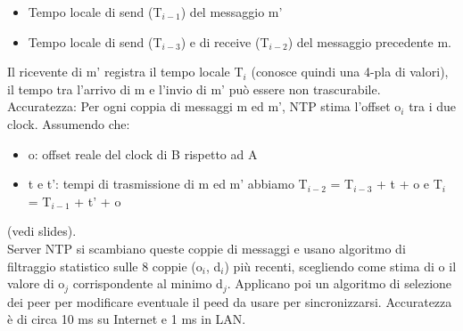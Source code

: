 \documentclass[16px]{article}
\begin{document}
\begin{itemize}
\item Tempo locale di send (T$_{i-1}$) del messaggio m'
\item Tempo locale di send (T$_{i-3}$) e di receive (T$_{i-2}$) del messaggio precedente m.
\end{itemize}
Il ricevente di m' registra il tempo locale T$_i$ (conosce quindi una 4-pla di valori), il tempo tra l'arrivo di m e l'invio di m' può essere non trascurabile.\\ Accuratezza: Per ogni coppia di messaggi m ed m', NTP stima l'offset o$_i$ tra i due clock. Assumendo che:
\begin{itemize}
\item o: offset reale del clock di B rispetto ad A
\item t e t': tempi di trasmissione di m ed m' abbiamo
T$_{i-2}$ =  T$_{i-3}$ + t + o e T$_i$ = T$_{i-1}$ + t' + o
\end{itemize}
(vedi slides). \\ Server NTP si scambiano queste coppie di messaggi e usano algoritmo di filtraggio statistico sulle 8 coppie (o$_i$, d$_i$) più recenti, scegliendo come stima di o il valore di o$_j$ corrispondente al minimo d$_j$. Applicano poi un algoritmo di selezione dei peer per modificare eventuale il peed da usare per sincronizzarsi. Accuratezza è di circa 10 ms su Internet e 1 ms in LAN.
\end{document}

